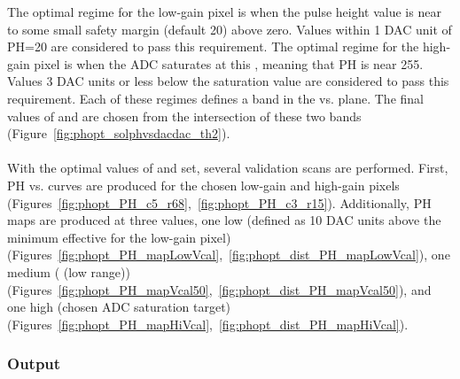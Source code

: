 The optimal regime for the low-gain pixel is when the pulse height value is near to some small safety margin (default 20) above zero.
Values within 1 DAC unit of PH=20 are considered to pass this requirement.
The optimal regime for the high-gain pixel is when the ADC saturates at this \vcal, meaning that PH is near 255.
Values 3 DAC units or less below the saturation value are considered to pass this requirement.
Each of these regimes defines a band in the \phoffset vs. \phscale plane.
The final values of \phscale and \phoffset are chosen from the intersection of these two bands (Figure~\ref{fig:phopt_solphvsdacdac_th2}).
\\\\
With the optimal values of \phscale and \phoffset set, several validation scans are performed.
First, PH vs. \vcal curves are produced for the chosen low-gain and high-gain pixels
(Figures~\ref{fig:phopt_PH_c5_r68},~\ref{fig:phopt_PH_c3_r15}).
Additionally, PH maps are produced at three \vcal values,
one low (defined as 10 DAC units above the minimum effective \vcal for the low-gain pixel)
(Figures~\ref{fig:phopt_PH_mapLowVcal},~\ref{fig:phopt_dist_PH_mapLowVcal}),
one medium ( (low range))
(Figures~\ref{fig:phopt_PH_mapVcal50},~\ref{fig:phopt_dist_PH_mapVcal50}),
and one high (chosen ADC saturation target)
(Figures~\ref{fig:phopt_PH_mapHiVcal},~\ref{fig:phopt_dist_PH_mapHiVcal}).

\subsubsection{Output}


